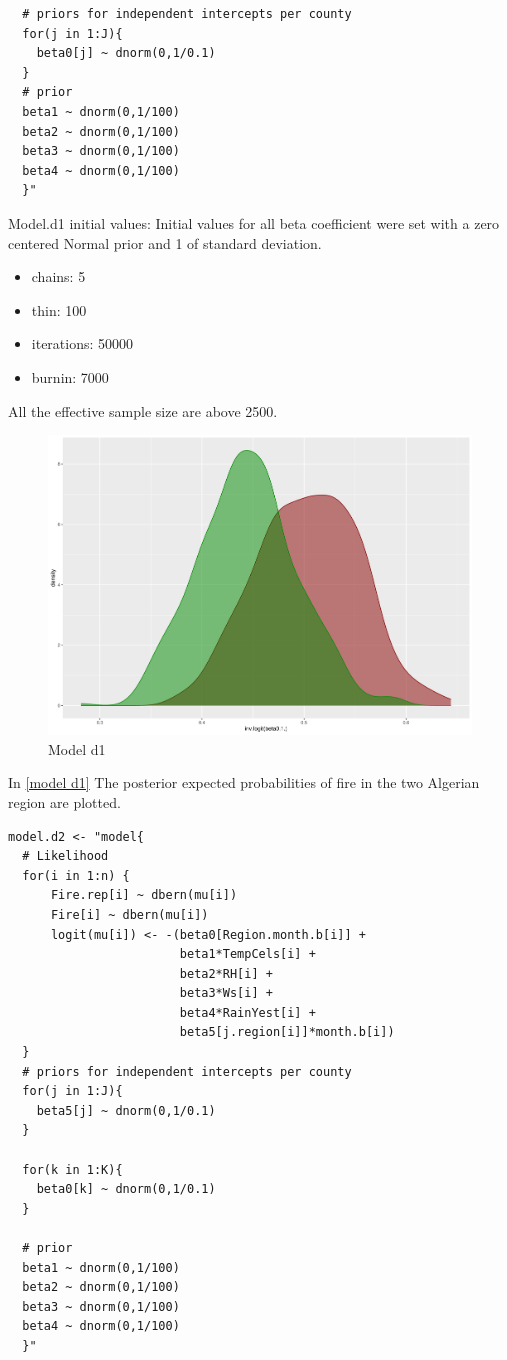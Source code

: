 \documentclass[12pt,a4paper]{article}
\begin{document}
\begin{enumerate}[(a)]
\begin{verbatim}
  # priors for independent intercepts per county
  for(j in 1:J){
    beta0[j] ~ dnorm(0,1/0.1)
  }
  # prior
  beta1 ~ dnorm(0,1/100)
  beta2 ~ dnorm(0,1/100)
  beta3 ~ dnorm(0,1/100)
  beta4 ~ dnorm(0,1/100)
  }"
\end{verbatim}

Model.d1 initial values: 
Initial values for all beta coefficient were set with a zero centered Normal prior and 1 of standard deviation.
\begin{itemize}
\item chains: 5
\item thin: 100
\item iterations: 50000
\item burnin: 7000
\end{itemize}

All the effective sample size are above 2500. 

\begin{figure}[h]
    \centering
    \includegraphics[width=0.6\linewidth]{figures/Rplot09.pdf}
    \caption{Model d1}
    \label{model d1}
\end{figure}

In \autoref{model d1} The posterior expected probabilities of fire in the two Algerian region are plotted.

\begin{verbatim}
model.d2 <- "model{
  # Likelihood
  for(i in 1:n) {
      Fire.rep[i] ~ dbern(mu[i])
      Fire[i] ~ dbern(mu[i])
      logit(mu[i]) <- -(beta0[Region.month.b[i]] + 
                        beta1*TempCels[i] + 
                        beta2*RH[i] + 
                        beta3*Ws[i] + 
                        beta4*RainYest[i] +
                        beta5[j.region[i]]*month.b[i])
  }
  # priors for independent intercepts per county
  for(j in 1:J){
    beta5[j] ~ dnorm(0,1/0.1)
  }
  
  for(k in 1:K){
    beta0[k] ~ dnorm(0,1/0.1)
  }
  
  # prior
  beta1 ~ dnorm(0,1/100)
  beta2 ~ dnorm(0,1/100)
  beta3 ~ dnorm(0,1/100)
  beta4 ~ dnorm(0,1/100)
  }"
\end{verbatim}


\end{enumerate}
\end{document}

